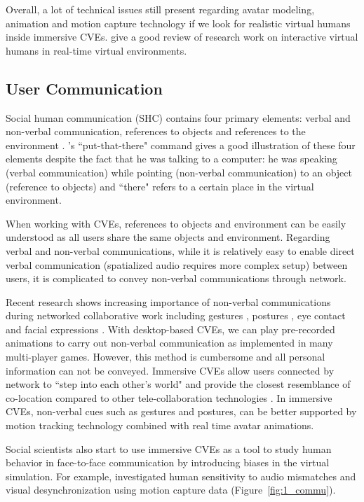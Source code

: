 Overall, a lot of technical issues still present regarding avatar modeling, animation and motion capture technology if we look for realistic virtual humans inside immersive CVEs. \citet{Magnenat2006Interactive} give a good review of research work on interactive virtual humans in real-time virtual environments.


\subsection{User Communication}
\label{sec:user-com}
Social human communication (SHC) contains four primary elements: verbal and non-verbal communication, references to objects and references to the environment \citep{Burgoon1994Human}. \citet{Bolt1980Put}'s ``put-that-there" command gives a good illustration of these four elements despite the fact that he was talking to a computer: he was speaking (verbal communication) while pointing (non-verbal communication) to an object (reference to objects) and ``there" refers to a certain place in the virtual environment. 

When working with CVEs, references to objects and environment can be easily understood as all users share the same objects and environment. Regarding verbal and non-verbal communications, while it is relatively easy to enable direct verbal communication (spatialized audio requires more complex setup) between users, it is complicated to convey non-verbal communications through network.

Recent research shows increasing importance of non-verbal communications during networked collaborative work \citep{Guye1999Nonverbal, Roberts2004SSH} including gestures \citep{Dodds2011Talk}, postures \citep{Normand2012Full}, eye contact \citep{Bailenson2002Gaze, Garau2003Impact} and facial expressions \citep{Boker2009Effects}. With desktop-based CVEs, we can play pre-recorded animations to carry out non-verbal communication as implemented in many multi-player games. However, this method is cumbersome and all personal information can not be conveyed. Immersive CVEs allow users connected by network to ``step into each other's world" and provide the closest resemblance of co-location compared to other tele-collaboration technologies \citep{Wolff2007Review}. In immersive CVEs, non-verbal cues such as gestures and postures, can be better supported by motion tracking technology combined with real time avatar animations.

Social scientists also start to use immersive CVEs as a tool to study human behavior in face-to-face communication by introducing biases in the virtual simulation. For example, \citet{Ennis2010Seeing} investigated human sensitivity to audio mismatches and visual desynchronization using motion capture data (Figure~\ref{fig:1_commu}). 

